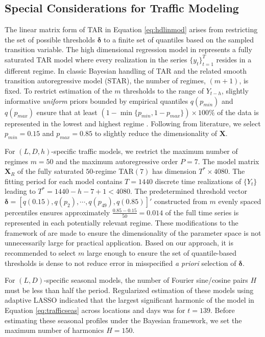 \subsection{Special Considerations for Traffic Modeling}
The linear matrix form of TAR in Equation \ref{eq:hdlinmod} arises from restricting the set of possible thresholds  $\bm{\delta}$ to a finite set of quantiles based on the sampled transition variable. The high dimensional regression model in \cite{Chan2015,Chan2017} represents a fully saturated TAR model where every realization in the series $\{y_t\}_{t=1}^T$ resides in a different regime. In classic Bayesian handling of TAR and the related smooth transition autoregressive model (STAR), the number of regimes, $(m+1)$, is fixed. To restrict estimation of the $m$ thresholds to the range of $Y_{t-h}$, slightly informative \textit{uniform} priors bounded by empirical quantiles $q(p_{min})$ and $q(p_{max})$ ensure that at least $(1-\min\{p_{min},1-p_{max}\})\times 100\%$ of the data is represented in the lowest and highest regime \citep{Chen1995,Chen1998,Lubrano2000,Lopes2006}. Following from literature, we select $p_{min}=0.15$ and $p_{max}=0.85$ to slightly reduce the dimensionality of $\bm{X}$.

For $(L,D,h)$-specific traffic models, we restrict the maximum number of regimes $m=50$ and the maximum autoregressive order $P=7$. The model matrix $\bm{X}_R$ of the fully saturated $50$-regime TAR$(7)$ has dimension $T^*\times 4080$. The fitting period for each model contains $T=1440$ discrete time realizations of $\{Y_t\}$ leading to $T^*=1440-h-7+1 < 4080$. The predetermined threshold vector $\bm{\delta}=[q(0.15),q(p_2),\cdots,q(p_{49}),q(0.85)]'$ constructed from $m$ evenly spaced percentiles ensures approximately $\frac{0.85-0.15}{50}=0.014$ of the full time series is represented in each potentially relevant regime. These modifications to the framework of \cite{Chan2015,Chan2017} are made to ensure the dimensionality of the parameter space is not unnecessarily large for practical application. Based on our approach, it is recommended to select $m$ large enough to ensure the set of quantile-based thresholds is dense to not reduce error in misspecified \textit{a priori} selection of $\bm{\delta}$.

For $(L,D)$-specific seasonal models, the number of Fourier sine/cosine pairs $H$ must be less than half the period. Regularized estimation of these models using adaptive LASSO \citep{Zou2006} indicated that the largest significant harmonic of the model in Equation \ref{eq:trafficseas} across locations and days was for $t=139$. Before estimating these seasonal profiles under the Bayesian framework, we set the maximum number of harmonics $H=150$.








